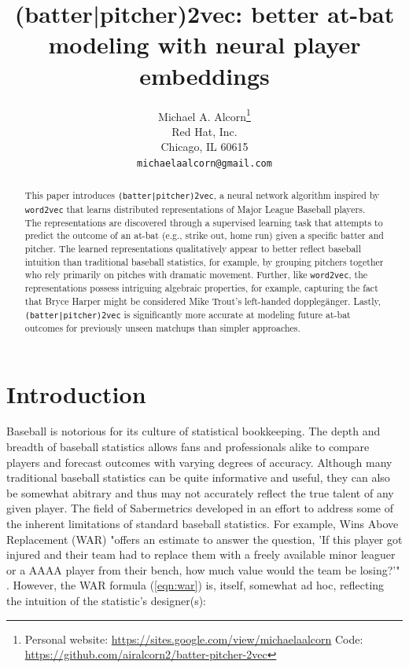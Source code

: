 \documentclass{article}
\title{(batter|pitcher)2vec: better at-bat modeling with neural player embeddings}
\date{}
\author{
    Michael A. Alcorn\thanks
    {Personal website: \url{https://sites.google.com/view/michaelaalcorn}\newline
    \hspace*{1.8em}Code: \url{https://github.com/airalcorn2/batter-pitcher-2vec}} \\
    Red Hat, Inc.\\
    Chicago, IL 60615 \\
    \texttt{michaelaalcorn@gmail.com} \\
}
\begin{document}
\maketitle

\begin{abstract}

This paper introduces \texttt{(batter|pitcher)2vec}, a neural network algorithm inspired by \texttt{word2vec} that learns distributed representations of Major League Baseball players. The representations are discovered through a supervised learning task that attempts to predict the outcome of an at-bat (e.g., strike out, home run) given a specific batter and pitcher. The learned representations qualitatively appear to better reflect baseball intuition than traditional baseball statistics, for example, by grouping pitchers together who rely primarily on pitches with dramatic movement. Further, like \texttt{word2vec}, the representations possess intriguing algebraic properties, for example, capturing the fact that Bryce Harper might be considered Mike Trout's left-handed dopplegänger. Lastly, \texttt{(batter|pitcher)2vec} is significantly more accurate at modeling future at-bat outcomes for previously unseen matchups than simpler approaches.

\end{abstract}

\section{Introduction}

Baseball is notorious for its culture of statistical bookkeeping. The depth and breadth of baseball statistics allows fans and professionals alike to compare players and forecast outcomes with varying degrees of accuracy. Although many traditional baseball statistics can be quite informative and useful, they can also be somewhat abitrary and thus may not accurately reflect the true talent of any given player. The field of Sabermetrics developed in an effort to address some of the inherent limitations of standard baseball statistics. For example, Wins Above Replacement (WAR) "offers an estimate to answer the question, 'If this player got injured and their team had to replace them with a freely available minor leaguer or a AAAA player from their bench, how much value would the team be losing?'" \parencite{WAR}. However, the WAR formula (\ref{eqn:war}) is, itself, somewhat ad hoc, reflecting the intuition of the statistic's designer(s):
\end{document}
